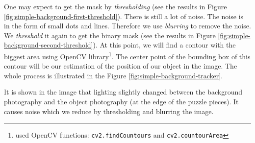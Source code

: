 One may expect to get the mask by \emph{thresholding} (see the results in
Figure \ref{fig:simple-background-first-threshold}). There is still a lot of
noise.  The noise is in the form of small dots and lines. Therefore we use
\emph{blurring} to remove the noise. We \emph{threshold} it again to get the
binary mask (see the results in Figure
\ref{fig:simple-background-second-threshold}).  At this point, we will find a
contour with the biggest area using OpenCV library\footnote{used OpenCV
functions: \verb+cv2.findCountours+ and \verb+cv2.countourArea+}. The center
point of the bounding box of this contour will be our estimation of the
position of our object in the image. The whole process is illustrated in the
Figure \ref{fig:simple-background-tracker}.

It is shown in the image that lighting slightly changed between the background
photography and the object photography (at the edge of the puzzle pieces). It
causes noise which we reduce by thresholding and blurring the image.

